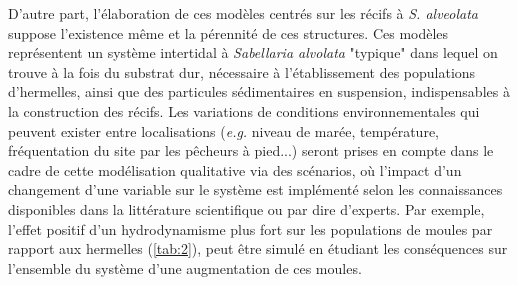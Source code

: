 \documentclass[12pt]{report}
\begin{document}
D’autre part, l’élaboration de ces modèles centrés sur les récifs à \textit{S. alveolata} suppose l’existence même et la pérennité de ces structures. Ces modèles représentent un système intertidal à \textit{Sabellaria alvolata} "typique" dans lequel on trouve à la fois du substrat dur, nécessaire à l'établissement des populations d'hermelles, ainsi que des particules sédimentaires en suspension, indispensables à la construction des récifs.
Les variations de conditions environnementales qui peuvent exister entre localisations (\textit{e.g.} niveau de marée, température, fréquentation du site par les pêcheurs à pied...) seront prises en compte dans le cadre de cette modélisation qualitative via des scénarios, où l'impact d'un changement d'une variable sur le système est implémenté selon les connaissances disponibles dans la littérature scientifique ou par dire d'experts. Par exemple, l'effet positif d'un hydrodynamisme plus fort sur les populations de moules par rapport aux hermelles (\autoref{tab:2}), peut être simulé en étudiant les conséquences sur l'ensemble du système d'une augmentation de ces moules.

\bigbreak
\end{document}
